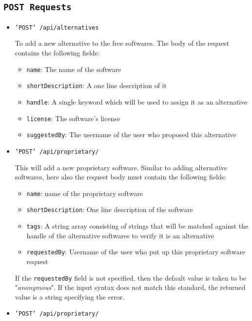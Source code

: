 \subsection{\texttt{POST Requests}}

\begin{itemize}

\item{\texttt{'POST' /api/alternatives}}

To add a new alternative to the free softwares. The body of the request contains the following fields:

\begin{itemize}
\item \texttt{name}: The name of the software
\item \texttt{shortDescription}: A one line description of it
\item \texttt{handle}: A single keyword which will be used to assign it as an alternative
\item \texttt{license}: The software's license
\item \texttt{suggestedBy}: The username of the user who proposed this alternative
\end{itemize}

\item{\texttt{'POST' /api/proprietary/}}

This will add a new proprietary software. Similar to adding alternative softwares, here also the request body must contain the following fields:
\begin{itemize}
\item \texttt{name}: name of the proprietary software
\item \texttt{shortDescription}: One line description of the software
\item \texttt{tags}: A string array consisting of strings that will be matched against the handle of the alternative softwares to verify it is an alternative
\item \texttt{requestedBy}: Username of the user who put up this proprietary software request
\end{itemize}

If the \texttt{requestedBy} field is not specified, then the default value is taken to be "\textsl{anonymous}". If the input syntax does not match this standard, the returned value is a string specifying the error.



\item{\texttt{'POST' /api/proprietary/}}


\end{itemize}
